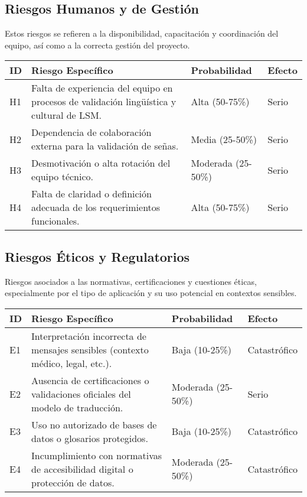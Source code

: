 \subsection{Riesgos Humanos y de Gestión}
Estos riesgos se refieren a la disponibilidad, capacitación y coordinación del equipo, así como a la correcta gestión del proyecto.

\begin{longtable}{|>{\centering\arraybackslash}p{1cm}|>{\raggedright\arraybackslash}p{8cm}|>{\centering\arraybackslash}p{3cm}|>{\centering\arraybackslash}p{3cm}|}
	\hline
	\textbf{ID} & \textbf{Riesgo Específico} & \textbf{Probabilidad} & \textbf{Efecto} \\
	\hline
	H1 & Falta de experiencia del equipo en procesos de validación lingüística y cultural de LSM. & Alta (50-75\%) & Serio \\
	\hline
	H2 & Dependencia de colaboración externa para la validación de señas. & Media (25-50\%) & Serio \\
	\hline
	H3 & Desmotivación o alta rotación del equipo técnico. & Moderada (25-50\%) & Serio \\
	\hline
	H4 & Falta de claridad o definición adecuada de los requerimientos funcionales. & Alta (50-75\%) & Serio \\
	\hline
\end{longtable}

\subsection{Riesgos Éticos y Regulatorios}
Riesgos asociados a las normativas, certificaciones y cuestiones éticas, especialmente por el tipo de aplicación y su uso potencial en contextos sensibles.

\begin{longtable}{|>{\centering\arraybackslash}p{1cm}|>{\raggedright\arraybackslash}p{8cm}|>{\centering\arraybackslash}p{3cm}|>{\centering\arraybackslash}p{3cm}|}
	\hline
	\textbf{ID} & \textbf{Riesgo Específico} & \textbf{Probabilidad} & \textbf{Efecto} \\
	\hline
	E1 & Interpretación incorrecta de mensajes sensibles (contexto médico, legal, etc.). & Baja (10-25\%) & Catastrófico \\
	\hline
	E2 & Ausencia de certificaciones o validaciones oficiales del modelo de traducción. & Moderada (25-50\%) & Serio \\
	\hline
	E3 & Uso no autorizado de bases de datos o glosarios protegidos. & Baja (10-25\%) & Catastrófico \\
	\hline
	E4 & Incumplimiento con normativas de accesibilidad digital o protección de datos. & Moderada (25-50\%) & Catastrófico \\
	\hline
\end{longtable}

